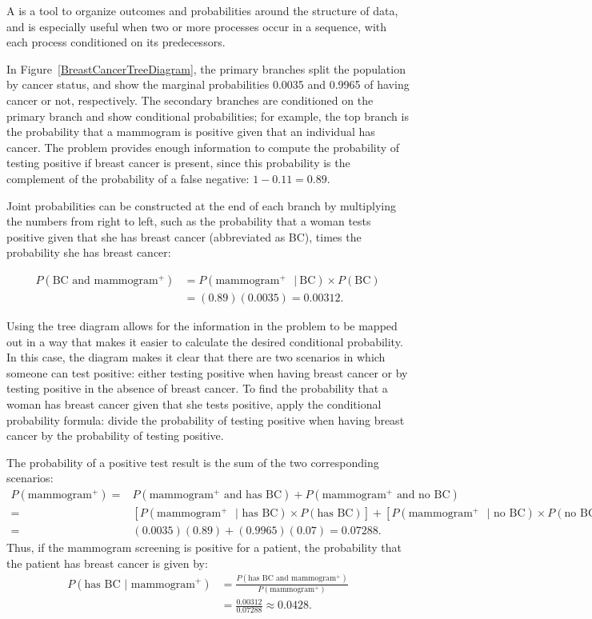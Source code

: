 A  is a tool to organize outcomes and probabilities around the structure of data, and is especially useful when two or more processes occur in a sequence, with each process  conditioned on its predecessors. 

In Figure~\ref{BreastCancerTreeDiagram}, the primary branches split the population by cancer status, and show the marginal probabilities 0.0035 and 0.9965 of having cancer or not, respectively. The secondary branches are conditioned on the primary branch and show conditional probabilities; for example, the top branch is the probability that a mammogram is positive given that an individual has cancer. The problem provides enough information to compute the probability of testing positive if breast cancer is present, since this probability is the complement of the probability of a false negative: $1 - 0.11 = 0.89$.

Joint probabilities can be constructed at the end of each branch by multiplying the numbers from right to left, such as the probability that a woman tests positive given that she has breast cancer (abbreviated as BC),  times the probability she has breast cancer:

\begin{align*}
P(\text{BC and mammogram$^+$}) &= P(\text{mammogram$^+$ } |\ \text{BC}) \times  P(\text{BC}) \\
	&= (0.89) (0.0035) = 0.00312.
\end{align*}

\textD{\newpage}

Using the tree diagram allows for the information in the problem to be mapped out in a way that makes it easier to calculate the desired conditional probability. In this case, the diagram makes it clear that there are two scenarios in which someone can test positive: either testing positive when having breast cancer or by testing positive in the absence of breast cancer. To find the probability that a woman has breast cancer given that she tests positive, apply the conditional probability formula: divide the probability of testing positive when having breast cancer by the probability of testing positive.

The probability of a positive test result is the sum of the two corresponding scenarios:
\begin{align*}
P(\text{mammogram$^+$}) =&  P(\text{mammogram$^+$ and has BC}) + P(\text{mammogram$^+$ and no BC}) \\
=&[P(\text{mammogram$^+$ } | \text{ has BC}) \times P(\text{has BC})] + [P(\text{mammogram$^+$ } | \text{ no BC}) \times P(\text{no BC})] \\
=& (0.0035)(0.89) + (0.9965)(0.07) = 0.07288.
\end{align*}
Thus, if the mammogram screening is positive for a patient, the probability that the patient has breast cancer is given by: 
\begin{align*}
P(\text{has BC } | \text{ mammogram$^+$})
	&= \frac{P(\text{has BC and mammogram$^+$})}{P(\text{mammogram$^+$})}\\
	&= \frac{0.00312}{0.07288} \approx 0.0428.
\end{align*}

